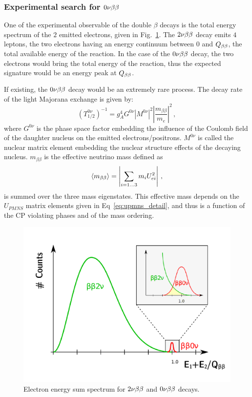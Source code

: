 \subsubsection*{Experimental search for $0\nu\beta\beta$}

One of the experimental observable of the double $\beta$ decays is the total energy spectrum of the $2$ emitted electrons, given in Fig.~\ref{fig:bb_energy}.
The $2\nu\beta\beta$ decay emits $4$ leptons, the two electrons having an energy continuum between $0$ and $Q_{\beta\beta}$, the total available energy of the reaction.
In the case of the $0\nu\beta\beta$ decay, the two electrons would bring the total energy of the reaction, thus the expected signature would be an energy peak at $Q_{\beta\beta}$.

If existing, the $0\nu\beta\beta$ decay would be an extremely rare process.
The decay rate of the light Majorana exchange is given by:
\begin{equation}
  (T_{1/2}^{0\nu})^{-1} = g_{A}^{4}G^{0\nu}|M^{0\nu}|^{2}\left\lvert\dfrac{m_{\beta\beta}}{m_{e}}\right\rvert^{2}\,,
\end{equation}
where $G^{0\nu}$ is the phase space factor embedding the influence of the Coulomb field of the daughter nucleus on the emitted electrons/positrons.
$M^{0\nu}$ is called the nuclear matrix element embedding the nuclear structure effects of the decaying nucleus.
$m_{\beta\beta}$ is the effective neutrino mass defined as
\begin{equation}
  \langle m_{\beta\beta} \rangle = \left\vert \sum_{i=1...3}m_{i}U^{2}_{ei} \right\vert \,,
\end{equation}
is summed over the three mass eigenstates.
This effective mass depends on the $U_{PMNS}$ matrix elements given in Eq~\eqref{eq:upmns_detail}, and thus is a function of the CP violating phases and of the mass ordering.

\begin{figure}[h!]
  \centering
    \includegraphics[height=0.5\textwidth]{neutrinophysics/fig_neutrinophysics/reconstructed_energy.pdf}
  \caption{Electron energy sum spectrum for $2\nu\beta\beta$ and $0\nu\beta\beta$ decays.
    \label{fig:bb_energy}}
\end{figure}



